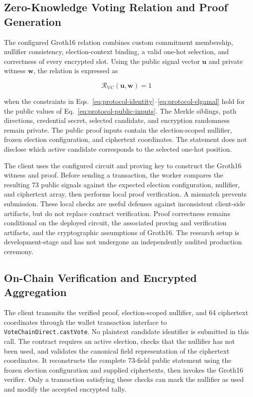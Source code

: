 \subsection{Zero-Knowledge Voting Relation and Proof Generation}
\label{subsec:protocol-verification}

The configured Groth16 relation combines custom commitment membership,
nullifier consistency, election-context binding, a valid one-hot selection,
and correctness of every encrypted slot. Using the public signal vector
$\mathbf{u}$ and private witness $\mathbf{w}$, the relation is expressed as

\begin{equation}
\label{eq:protocol-relation}
\mathcal{R}_{\mathrm{VC}}(\mathbf{u},\mathbf{w})=1
\end{equation}

when the constraints in
Eqs.~\eqref{eq:protocol-identity}--\eqref{eq:protocol-elgamal}
hold for the public values of
Eq.~\eqref{eq:protocol-public-inputs}. The Merkle siblings,
path directions, credential secret, selected candidate, and encryption
randomness remain private. The public proof inputs contain the
election-scoped nullifier, frozen election configuration, and ciphertext
coordinates. The statement does not disclose which active candidate
corresponds to the selected one-hot position.

The client uses the configured circuit and proving key to construct
the Groth16 witness and proof. Before sending a transaction, the worker
compares the resulting 73 public signals against the expected election
configuration, nullifier, and ciphertext array, then performs local
proof verification. A mismatch prevents submission. These local checks
are useful defenses against inconsistent client-side artifacts, but do not
replace contract verification. Proof correctness remains conditional on
the deployed circuit, the associated proving and verification artifacts,
and the cryptographic assumptions of Groth16. The research setup is
development-stage and has not undergone an independently audited
production ceremony.

\subsection{On-Chain Verification and Encrypted Aggregation}
\label{subsec:protocol-onchain-acceptance}

The client transmits the verified proof, election-scoped nullifier, and
64 ciphertext coordinates through the wallet transaction interface to
\texttt{VoteChainDirect.castVote}. No plaintext candidate identifier is
submitted in this call. The contract requires an active election,
checks that the nullifier has not been used, and validates the canonical
field representation of the ciphertext coordinates. It reconstructs
the complete 73-field public statement using the frozen election
configuration and supplied ciphertexts, then invokes the Groth16
verifier. Only a transaction satisfying these checks can mark the
nullifier as used and modify the accepted encrypted tally.

